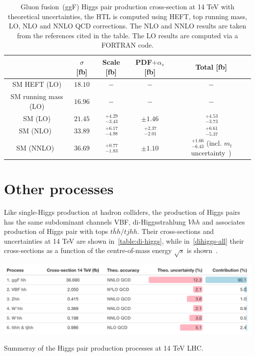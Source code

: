 \begin{table}
	\centering
	\begin{tabular}{ccccc}
		\toprule
		& $ \sigma$	[fb] & Scale [fb] & PDF$+\alpha_s$ [fb]& Total [fb] \\
		\midrule
		SM HEFT  (LO)      &  $ 18.10$    &   $-$      & $-$   &  $-$ \\
		SM   running mass (LO)  &  $ 16.96$    &   $ -$   & $-$   &  $-$ \\
		SM    (LO)  &  $ 21.45$    &   $ \,^{+4.29}_{-3.43}$   & $\pm 1.46$   &  $ \,^{+4.53}_{-3.73}$ \\
		SM   (NLO)~\cite{Baglio:2012np}  &  $ 33.89$   &   $ \,^{+6.17}_{-4.98}$   & $ \,^{+2.37}_{-2.01}$   &  $ \,^{+6.61}_{-5.37}$ \\
		SM   (NNLO)~\cite{Grazzini:2018bsd}  &  $36.69$    &    $ \,^{+0.77}_{-1.83}$   & $\pm 1.10$   &  $ \,^{+1.66}_{-6.43}$ {\tiny(incl. $m_t$ uncertainty~\cite{Baglio:2020wgt})} \\
		\bottomrule
	\end{tabular}
	\caption{Gluon fusion~(ggF) Higgs pair production cross-section at 14 TeV with theoretical  uncertainties, the HTL is computed using HEFT, top running mass, LO, NLO and NNLO QCD corrections. The NLO and NNLO results are taken from the references cited in the table. The LO results are computed via a FORTRAN code.}
		\label{ggf_xsres}
\end{table}

\section{Other processes\label{otherhh}  }
Like  single-Higgs production at hadron colliders, the production of Higgs pairs has the same subdominant channels VBF, di-Higgsstrahlung $ Vhh$ and associates production of Higgs pair with tops $t\bar hh /t j hh$. Their cross-sections and uncertainties at 14 TeV are shown in~\autoref{table:di-higgs}, while in~\autoref{dihiggs-all} their cross-sections as a function of the centre-of-mass energy $\sqrt{s}$ is shown~\cite{DiMicco:2019ngk}. 
\begin{table}[htbp!]
	\includegraphics[width=1\textwidth]{hh-table}
	\caption{ Summeray of the Higgs pair production processes at 14 TeV LHC. \label{table:di-higgs} }
\end{table}
